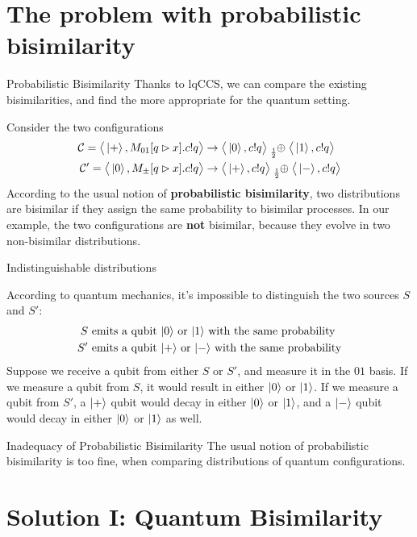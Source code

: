 \documentclass{beamer}
\newcommand{\kz}{\ket{0}}
\newcommand{\ko}{\ket{1}}
\newcommand{\kpl}{\ket{+}}
\newcommand{\km}{\ket{-}}
\newcommand{\psum}[1]{\tensor[_{#1}]{\oplus}{}}
\newcommand{\conf}{\mathcal{C}}
\newcommand{\confw}[1]{\big\langle#1\big\rangle}
\begin{document}
\section{The problem with probabilistic bisimilarity}
\begin{frame}{Probabilistic Bisimilarity}
Thanks to lqCCS, we can compare the existing bisimilarities, and find the more appropriate for the quantum setting. 
\pause

Consider the two configurations 
\begin{align*}
\conf = \confw{\kpl, M_{01}[q \rhd x].c!q} &\rightarrow \confw{\kz, c!q} \psum{\frac{1}{2}} \confw{\ko, c!q} \\
\conf' = \confw{\kz, M_{\pm}[q \rhd x].c!q} &\rightarrow \confw{\kpl, c!q} \psum{\frac{1}{2}} \confw{\km, c!q}
\end{align*}
\pause
According to the usual notion of \textbf{probabilistic bisimilarity}, two distributions are bisimilar if they assign the same probability to bisimilar processes. In our example, the two configurations  are \textbf{not} bisimilar, because they evolve in two non-bisimilar distributions.

\end{frame}

\begin{frame}{Indistinguishable distributions}

According to quantum mechanics, it's impossible to distinguish the two sources $S$ and $S'$:
\begin{align*}
S &\text{ emits a qubit $\kz$ or $\ko$ with the same probability}\\
S' &\text{ emits a qubit $\kpl$ or $\km$ with the same probability}
\end{align*}
Suppose we receive a qubit from either $S$ or $S'$, and measure it in the $01$ basis. If we measure a qubit from $S$, it would result in either $\kz$ or $\ko$. If we measure a qubit from $S'$, a $\kpl$ qubit would decay in either $\kz$ or $\ko$, and a $\km$ qubit would decay in either $\kz$ or $\ko$ as well.

\pause
\begin{block}{Inadequacy of Probabilistic Bisimilarity}
The usual notion of probabilistic bisimilarity is too fine, when comparing distributions of quantum configurations.
\end{block}
\end{frame}

\section{Solution I: Quantum Bisimilarity}
\end{document}
